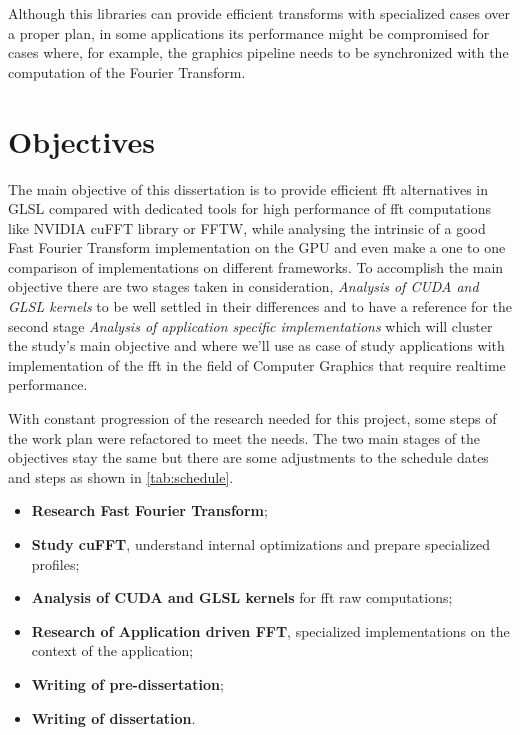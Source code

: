 \documentclass[
  oneside,
  11pt, a4paper,
  footinclude=true,
  headinclude=true,
  cleardoublepage=empty
]{scrbook}
\begin{document}
Although this libraries can provide efficient transforms with specialized cases over a proper plan, in some applications its performance might be compromised for cases where, for example, the graphics pipeline needs to be synchronized with the computation of the Fourier Transform.

\section{Objectives} \label{sec:objectives}

The main objective of this dissertation is to provide efficient \acrshort{fft} alternatives in GLSL compared with dedicated tools for high performance of \acrshort{fft} computations like NVIDIA cuFFT library or FFTW, while analysing the intrinsic of a good Fast Fourier Transform implementation on the GPU and even make a one to one comparison of implementations on different frameworks. %
To accomplish the main objective there are two stages taken in consideration, \textit{Analysis of CUDA and GLSL kernels} to be well settled in their differences and to have a reference for the second stage \textit{Analysis of application specific implementations} which will cluster the study's main objective and where we'll use as case of study applications with implementation of the \acrshort{fft} in the field of Computer Graphics that require realtime performance.


With constant progression of the research needed for this project, some steps of the work plan were refactored to meet the needs. The two main stages of the objectives stay the same but there are some adjustments to the schedule dates and steps as shown in \autoref{tab:schedule}.

\begin{itemize}
    \item \textbf{Research Fast Fourier Transform};
    \item \textbf{Study cuFFT}, understand internal optimizations and prepare specialized profiles;
    \item \textbf{Analysis of CUDA and GLSL kernels} for \acrshort{fft} raw computations;
    \item \textbf{Research of Application driven FFT}, specialized implementations on the context of the application;
    \item \textbf{Writing of pre-dissertation};
    \item \textbf{Writing of dissertation}.
\end{itemize}
\end{document}
